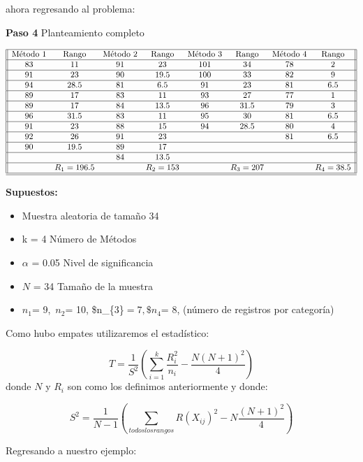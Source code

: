 \documentclass[
  a4paper,
  oneside,
  openany]{book}
\providecommand{\tightlist}{%
  \setlength{\itemsep}{0pt}\setlength{\parskip}{0pt}}
\begin{document}
ahora regresando al problema:

\textbf{Paso 4} Planteamiento completo

\[
\begin{array}{||c c c c c c c c ||} 
\hline
\mbox{Método 1} & \mbox{Rango} & \mbox{Método 2} & \mbox{Rango}  & \mbox{Método 3} & \mbox{Rango} & \mbox{Método 4} & \mbox{Rango} \\  
\hline
83 & 11 &91 &23 &101 &34 &78 &2 \\ 
\hline
91 & 23 & 90&19.5 &100 &33 &82 &9 \\
\hline
94 &28.5  &81 &6.5 &91 &23 &81 &6.5 \\
\hline
89 & 17 &83 &11 &93 &27 &77 &1 \\
\hline
89 & 17 &84 &13.5 &96 &31.5 &79 &3 \\
\hline
96 & 31.5 &83 &11 &95 &30 &81 &6.5 \\
\hline
91 & 23 &88 &15 &94 &28.5 &80 &4 \\
\hline
92 & 26 &91 &23 & & &81 &6.5 \\
\hline
90 & 19.5 &89 &17 & & && \\
\hline
& &84 &13.5 & & & & \\
\hline
& R_1=196.5 & &R_2=153 & &R_3=207 & &R_4=38.5 \\
\hline
\hline
\end{array}
\]

\textbf{Supuestos:}

\begin{itemize}
\tightlist
\item
  Muestra aleatoria de tamaño 34
\item
  k = 4 Número de Métodos
\item
  \(\alpha\) = 0.05 Nivel de significancia
\item
  \(N\) = 34 Tamaño de la muestra
\item
  \(n_{1}\)= 9,~\(n_{2}\)= 10, \$n\_\{3\}\(=7, \$n_{4}\)= 8, (número de registros por categoría)
\end{itemize}

Como hubo empates utilizaremos el estadístico:

\[T= \frac{1}{S^2}\left(\sum_{i=1}^{k}\frac{R^2_{i}}{n_{i}}-\frac{N(N+1)^2}{4}\right)\]
donde \(N\) y \(R_{i}\) son como los definimos anteriormente y donde:

\[ S^2 = \frac{1}{N-1}\left(\sum_{todos los rangos}R(X_{ij})^2-N\frac{(N+1)^2}{4}\right)\]

Regresando a nuestro ejemplo:
\end{document}

